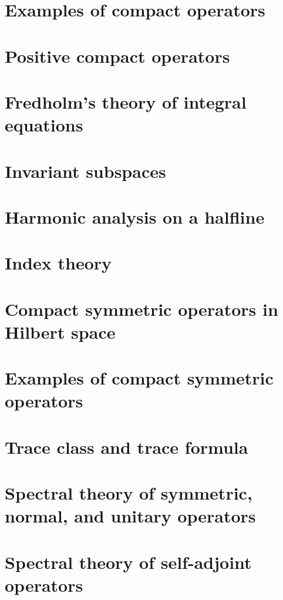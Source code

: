 \documentclass[11pt]{elegantbook}
\begin{document}
\chapter{Examples of compact operators}

\chapter{Positive compact operators}

\chapter{Fredholm's theory of integral equations}

\chapter{Invariant subspaces}

\chapter{Harmonic analysis on a halfline}

\chapter{Index theory}

\chapter{Compact symmetric operators in Hilbert space}

\chapter{Examples of compact symmetric operators}

\chapter{Trace class and trace formula}

\chapter{Spectral theory of symmetric, normal, and unitary operators}

\chapter{Spectral theory of self-adjoint operators}
\end{document}
